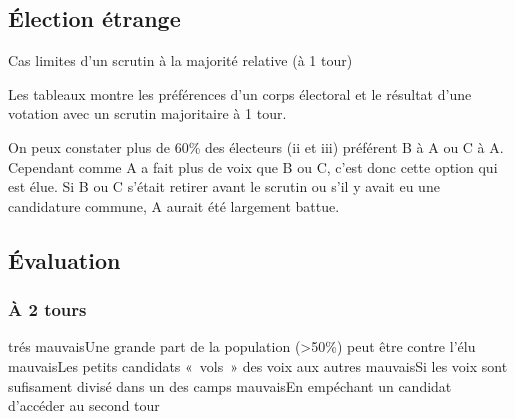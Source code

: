 \documentclass[../report]{subfiles}
\begin{document}
  \subsection{Élection étrange}

  \begin{table}[h]
    \begin{center}
      \caption{Cas limites d'un scrutin à la majorité relative (à 1 tour)}%
      \label{fig:diff:maj1:caslim1}
    \end{center}
  \end{table}

  Les tableaux  montre les préférences d'un corps 
  électoral et le résultat d'une votation avec un scrutin majoritaire à 1 tour.

  On peux constater plus de 60\% des électeurs (ii et iii) préférent B à A ou C à A. 
  Cependant comme A a fait plus de voix que B ou C, c'est donc cette option qui est élue.
  Si B ou C s'était retirer avant le scrutin ou s'il y avait eu une candidature commune, A aurait été largement battue. 

  \subsection{Évaluation}
  \subsubsection{À 2 tours}
  \tabcritere%
    {trés mauvais}{Une grande part de la population (>50\%) peut être contre l'élu}%
    {mauvais}{Les petits candidats «~vols~» des voix aux autres}%
    {mauvais}{Si les voix sont sufisament divisé dans un des camps}%
    {mauvais}{En empéchant un candidat d'accéder au second tour}
\end{document}

